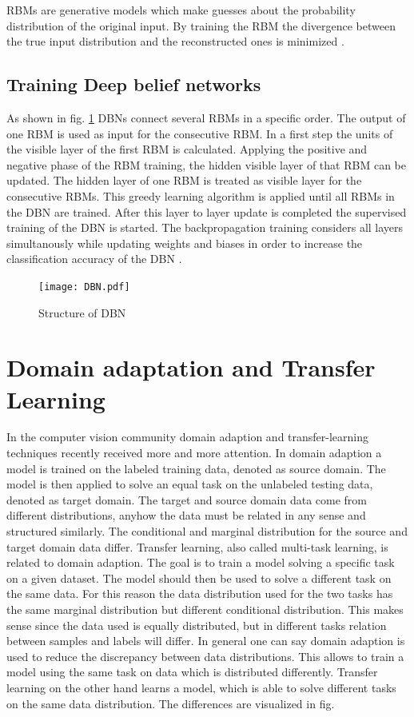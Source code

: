 RBMs are generative models which make guesses about the probability distribution of the original input. By training the RBM the divergence between the true input distribution and the reconstructed ones is minimized \cite{Hinton2010}.

\subsection{Training Deep belief networks}
As shown in fig. \ref{fig:DBN} DBNs connect several RBMs in a specific order. The output of one RBM is used as input for the consecutive RBM. In a first step the units of the visible layer of the first RBM is calculated. Applying the positive and negative phase of the RBM training, the hidden visible layer of that RBM can be updated. The hidden layer of one RBM is treated as visible layer for the consecutive RBMs. This greedy learning algorithm is applied until all RBMs in the DBN are trained. After this layer to layer update is completed the supervised training of the DBN is started. The backpropagation training considers all layers simultanously while updating weights and biases in order to increase the classification accuracy of the DBN \cite{Zhang2017}.

\begin{figure}[htpb]
  \centering
  \texttt{[image: DBN.pdf]}
  \caption {Structure of DBN \cite{Zhang2017}} \label{fig:DBN}
\end{figure}
\FloatBarrier 

\section{Domain adaptation and Transfer Learning}

In the computer vision community domain adaption and transfer-learning techniques recently received more and more attention. In domain adaption a model is trained on the labeled training data, denoted as source domain. The model is then applied to solve an equal task on the unlabeled testing data, denoted as target domain. The target and source domain data come from different distributions, anyhow the data must be related in any sense and structured similarly. The conditional and marginal distribution for the source and target domain data differ. Transfer learning, also called multi-task learning, is related to domain adaption. The goal is to train a model solving a specific task on a given dataset. The model should then be used to solve a different task on the same data. For this reason the data distribution used for the two tasks has the same marginal distribution but different conditional distribution. This makes sense since the data used is equally distributed, but in different tasks relation between samples and labels will differ. In general one can say domain adaption is used to reduce the discrepancy between data distributions. This allows to train a model using the same task on data which is distributed differently. Transfer learning on the other hand learns a model, which is able to solve different tasks on the same data distribution. The differences are visualized in fig. \label{fig:domain_adaption_vs_transfer_learning}


